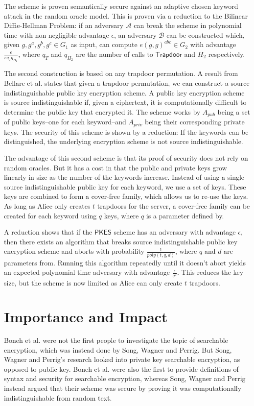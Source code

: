 \documentclass[a4paper,11pt]{article}
\begin{document}
    The scheme is proven semantically secure against an adaptive chosen keyword attack in the random oracle model. This is proven via a reduction to the Bilinear Diffie-Hellman Problem: if an adversary $\mathcal{A}$ can break the scheme in polynomial time with non-negligible advantage $\epsilon$, an adversary $\mathcal{B}$ can be constructed which, given $g, g^a, g^b, g^c \in G_1$ as input, can compute $e(g, g)^{abc} \in G_2$ with advantage $\frac{\epsilon}{eq_Tq_{H_2}}$, where $q_T$ and $q_{H_2}$ are the number of calls to $\mathsf{Trapdoor}$ and $H_2$ respectively.

    The second construction is based on any trapdoor permutation. A result from Bellare et al.\cite{bellare:source} states that given a trapdoor permutation, we can construct a source indistinguishable public key encryption scheme. A public key encryption scheme is source indistinguishable if, given a ciphertext, it is computationally difficult to determine the public key that encrypted it. The scheme works by $A_{pub}$ being a set of public keys--one for each keyword--and $A_{priv}$ being their corresponding private keys. The security of this scheme is shown by a reduction: If the keywords can be distinguished, the underlying encryption scheme is not source indistinguishable.

    The advantage of this second scheme is that its proof of security does not rely on random oracles. But it has a cost in that the public and private keys grow linearly in size as the number of the keywords increase. Instead of using a single source indistinguishable public key for each keyword, we use a set of keys. These keys are combined to form a cover-free family, which allows us to re-use the keys. As long as Alice only creates $t$ trapdoors for the server, a cover-free family can be created for each keyword using $q$ keys, where $q$ is a parameter defined by\cite{du:cover-free-families}.

    A reduction shows that if the $\mathsf{PKES}$ scheme has an adversary with advantage $\epsilon$, then there exists an algorithm that breaks source indistinguishable public key encryption scheme and aborts with probability $\frac{1}{poly(t, q, d)}$, where $q$ and $d$ are parameters from\cite{du:cover-free-families}. Running this algorithm repeatedly until it doesn't abort yields an expected polynomial time adversary with advantage $\frac{\epsilon}{q^2}$. This reduces the key size, but the scheme is now limited as Alice can only create $t$ trapdoors.

    \section{Importance and Impact}
    Boneh et al. were not the first people to investigate the topic of searchable encryption, which was instead done by Song, Wagner and Perrig\cite{848445}. But Song, Wagner and Perrig's research looked into private key searchable encryption, as opposed to public key. Boneh et al. were also the first to provide definitions of syntax and security for searchable encryption, whereas Song, Wagner and Perrig instead argued that their scheme was secure by proving it was computationally indistinguishable from random text.
\end{document}
